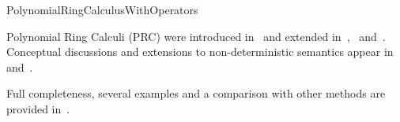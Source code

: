 \begin{entry}{PolynomialRingCalculusWithOperators}
\begin{history}
  Polynomial Ring Calculi (PRC) were introduced in~\cite{car:2005} and extended
  in~\cite{Carnielli2007},~\cite{agude-car:2011} and~\cite{agude-car:2015}.
  Conceptual discussions and extensions to non-deterministic semantics appear
  in~\cite{car-mat:2014} and~\cite{car-mat:2015}.
\end{history}

\begin{technicalities}
  Full completeness, several examples and a comparison with other methods are
  provided in~\cite{agude-car:2015}.  
\end{technicalities}


\end{entry}
